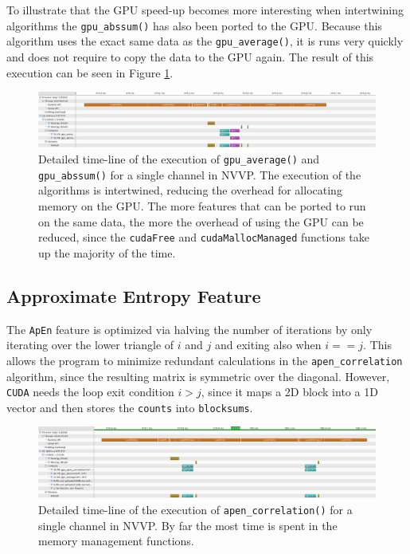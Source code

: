 \documentclass[a4paper]{article}
\begin{document}
To illustrate that the GPU speed-up becomes more interesting when intertwining algorithms the \texttt{gpu\_abssum()} has also been ported to the GPU. Because this algorithm uses the exact same data as the \texttt{gpu\_average()}, it is runs very quickly and does not require to copy the data to the GPU again. The result of this execution can be seen in Figure \ref{fig:GPU_abs_detail}.

\begin{figure}[H]
\begin{center}
\includegraphics[scale=0.35]{images/06_detail_cudaMallocManaged_with_sta.PNG}
\caption{Detailed time-line of the execution of \texttt{gpu\_average()} and \texttt{gpu\_abssum()} for a single channel in NVVP. The execution of the algorithms is intertwined, reducing the overhead for allocating memory on the GPU. The more features that can be ported to run on the same data, the more the overhead of using the GPU can be reduced, since the \texttt{cudaFree} and \texttt{cudaMallocManaged} functions take up the majority of the time.}
\label{fig:GPU_abs_detail}
\end{center}
\end{figure}


\subsection{Approximate Entropy Feature}

The \texttt{ApEn} feature is optimized via halving the number of iterations by only iterating over the lower triangle of $i$ and $j$ and exiting also when $i==j$. This allows the program to minimize redundant calculations in the \texttt{apen\_correlation} algorithm, since the resulting matrix is symmetric over the diagonal. However, \texttt{CUDA} needs the loop exit condition $i>j$, since it maps a 2D block into a 1D vector and then stores the \texttt{counts} into \texttt{blocksums}.

\begin{figure}[H]
\begin{center}
\includegraphics[scale=0.35]{images/09_cuda_apen_detail.PNG}
\caption{Detailed time-line of the execution of \texttt{apen\_correlation()} for a single channel in NVVP. By far the most time is spent in the memory management functions.}
\label{fig:GPU_apen_detail}
\end{center}
\end{figure}
\end{document}
